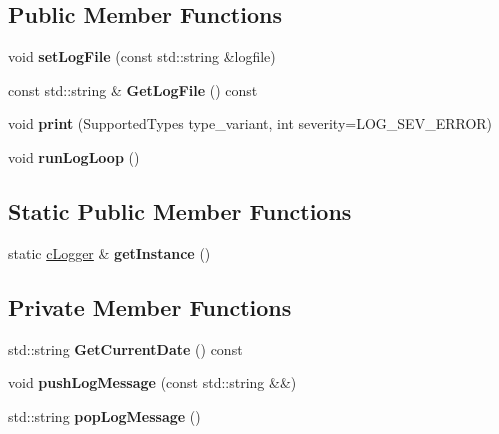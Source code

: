 \subsection*{Public Member Functions}
\begin{DoxyCompactItemize}
\item 
\hypertarget{classengine_1_1cLogger_a1d63876f78fe19aecf44ceb0bca2c18f}{void {\bfseries set\-Log\-File} (const std\-::string \&logfile)}\label{classengine_1_1cLogger_a1d63876f78fe19aecf44ceb0bca2c18f}

\item 
\hypertarget{classengine_1_1cLogger_a3d84334770de811027963be67a41a75d}{const std\-::string \& {\bfseries Get\-Log\-File} () const }\label{classengine_1_1cLogger_a3d84334770de811027963be67a41a75d}

\item 
\hypertarget{classengine_1_1cLogger_a660eccae1e005c59892e9c79da3add75}{void {\bfseries print} (Supported\-Types type\-\_\-variant, int severity=L\-O\-G\-\_\-\-S\-E\-V\-\_\-\-E\-R\-R\-O\-R)}\label{classengine_1_1cLogger_a660eccae1e005c59892e9c79da3add75}

\item 
\hypertarget{classengine_1_1cLogger_a592b9acb2cef11d527933049a59780b9}{void {\bfseries run\-Log\-Loop} ()}\label{classengine_1_1cLogger_a592b9acb2cef11d527933049a59780b9}

\end{DoxyCompactItemize}
\subsection*{Static Public Member Functions}
\begin{DoxyCompactItemize}
\item 
\hypertarget{classengine_1_1cLogger_a197dc84fcfab52b3b5facafe1cf3ff1a}{static \hyperlink{classengine_1_1cLogger}{c\-Logger} \& {\bfseries get\-Instance} ()}\label{classengine_1_1cLogger_a197dc84fcfab52b3b5facafe1cf3ff1a}

\end{DoxyCompactItemize}
\subsection*{Private Member Functions}
\begin{DoxyCompactItemize}
\item 
\hypertarget{classengine_1_1cLogger_a62d0c265a5fc3b81f8d31868edc34834}{std\-::string {\bfseries Get\-Current\-Date} () const }\label{classengine_1_1cLogger_a62d0c265a5fc3b81f8d31868edc34834}

\item 
\hypertarget{classengine_1_1cLogger_a856004a6201444ffe18cf18b3a50d44f}{void {\bfseries push\-Log\-Message} (const std\-::string \&\&)}\label{classengine_1_1cLogger_a856004a6201444ffe18cf18b3a50d44f}

\item 
\hypertarget{classengine_1_1cLogger_ac5a387de6eca4319501f7245e2513180}{std\-::string {\bfseries pop\-Log\-Message} ()}\label{classengine_1_1cLogger_ac5a387de6eca4319501f7245e2513180}

\end{DoxyCompactItemize}
